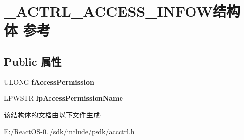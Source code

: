 \hypertarget{struct___a_c_t_r_l___a_c_c_e_s_s___i_n_f_o_w}{}\section{\+\_\+\+A\+C\+T\+R\+L\+\_\+\+A\+C\+C\+E\+S\+S\+\_\+\+I\+N\+F\+O\+W结构体 参考}
\label{struct___a_c_t_r_l___a_c_c_e_s_s___i_n_f_o_w}
\subsection*{Public 属性}
\begin{DoxyCompactItemize}
\item 
\mbox{\label{struct___a_c_t_r_l___a_c_c_e_s_s___i_n_f_o_w_a397d0ed69f52900e66724311df67e479}} 
U\+L\+O\+NG {\bfseries f\+Access\+Permission}
\item 
\mbox{\label{struct___a_c_t_r_l___a_c_c_e_s_s___i_n_f_o_w_a0726b0193344f774ad6ea60ff3c0fd0b}} 
L\+P\+W\+S\+TR {\bfseries lp\+Access\+Permission\+Name}
\end{DoxyCompactItemize}


该结构体的文档由以下文件生成\+:\begin{DoxyCompactItemize}
\item 
E\+:/\+React\+O\+S-\/0../sdk/include/psdk/accctrl.\+h\end{DoxyCompactItemize}
